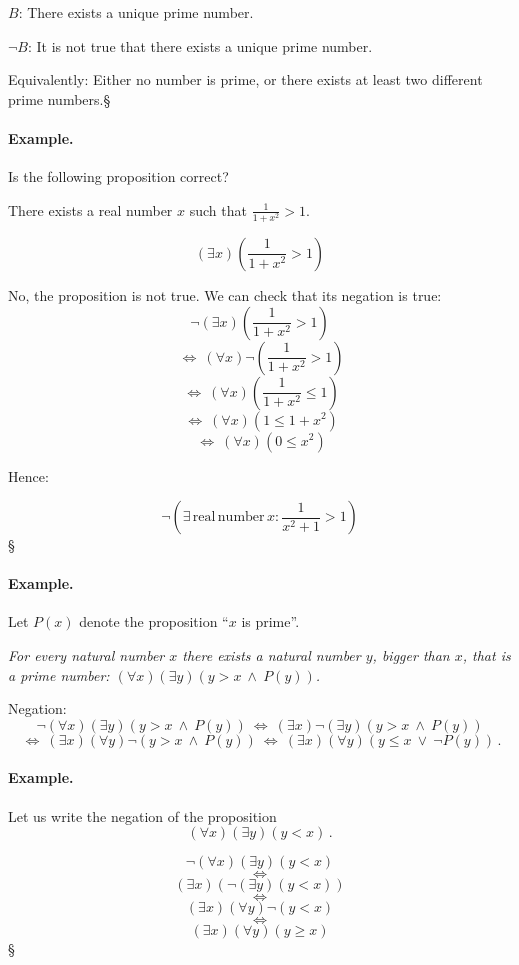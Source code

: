 \documentclass[11pt,paper=b5,footinclude,headinclude]{scrbook} %
\def\ali {{~\vee~}}
\def\inn {{~\wedge~}}
\def\cee {{~\Leftrightarrow~}}
\def\kz{{\hfill{\S}}}%
\theoremstyle{remark}
\theoremstyle{definition} %
\theoremstyle{theorem} %
\begin{document}
$B$: There exists a unique prime number.

$\neg B$: It is not true that there exists a unique prime number.

Equivalently: Either no number is prime, or there exists at least two different prime numbers.\kz

\bigskip
\paragraph{Example.}

Is the following proposition correct?

There exists a real number $x$ such that $\frac{1}{1+x^2}>1$.

$$(\exists x) (\frac{1}{1+x^2} > 1)$$

No, the proposition is not true. We can check that its negation is true:
$$\neg (\exists x) (\frac{1}{1+x^2} > 1)$$
$$\cee (\forall x) \neg (\frac{1}{1+x^2} > 1)$$
$$\cee (\forall x) (\frac{1}{1+x^2} \le  1)$$
$$\cee (\forall x) (1 \le  1+x^2)$$
$$\cee (\forall x) (0 \le  x^2)$$

Hence:

$$
\neg  \left(
\exists \,\mathrm{ real \, number }\,x: \frac{1}{x^2+1}>1
\right)
$$\kz


\medskip
\paragraph{Example.}

Let $P(x)$ denote the proposition ``$x$ is prime''.

\emph{ For every natural number $x$ there exists a natural number $y$, bigger than $x$, that is a prime number:
  $(\forall x)(\exists y)(y>x\inn P(y))$.}

  Negation:   $$\neg (\forall x)(\exists y)(y>x\inn P(y)) \cee(\exists  x)\neg (\exists y)(y>x\inn P(y))$$
  $$\cee(\exists  x)(\forall  y)\neg (y>x\inn P(y))\cee(\exists  x)(\forall  y)(y\le x\ali \neg P(y))\,.$$


\bigskip
\bigskip
\paragraph{Example.}
Let us write the negation of the proposition
  $$(\forall x)(\exists y)(y<x)\,.$$

  $$\neg(\forall x)(\exists y)(y<x)$$
  $$\cee$$
  $$(\exists x)(\neg(\exists y)(y<x))$$
  $$\cee$$
  $$(\exists x)(\forall y)\neg(y<x)$$
  $$\cee$$
  $$(\exists x)(\forall y)(y\ge x)$$\kz
\end{document}
